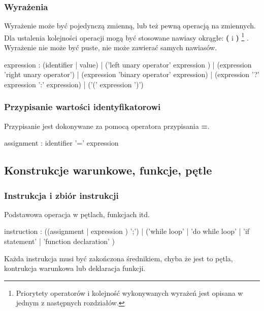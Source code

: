 \documentclass[12pt,a4paper]{article}
\begin{document}
\subsubsection{Wyrażenia}

Wyrażenie może być pojedynczą zmienną, lub też pewną operacją na zmiennych. Dla ustalenia kolejności operacji mogą być stosowane nawiasy okrągłe: \textbf{(} i \textbf{)}
\footnote{Priorytety operatorów i kolejność wykonywanych wyrażeń jest opisana w jednym z następnych rozdziałów.}
. Wyrażenie nie może być puste, nie może zawierać samych nawiasów.

\begin{rail}

expression : (identifier | value) | ('left unary operator' expression ) | (expression 'right unary operator') | (expression 'binary operator' expression) | (expression '?' expression ':' expression) | ('(' expression ')')

\end{rail}

\subsubsection{Przypisanie wartości identyfikatorowi}

Przypisanie jest dokonywane za pomocą operatora przypisania \textbf{=}. 

\begin{rail}
  assignment : identifier '=' expression
\end{rail}

\subsection{Konstrukcje warunkowe, funkcje, pętle}

\subsubsection{Instrukcja i zbiór instrukcji}

Podstawowa operacja w pętlach, funkcjach itd.

\begin{rail}
  instruction : ((assignment | expression ) ';') | ('while loop' | 'do while loop' | 'if   statement' | 'function declaration' )
\end{rail}

Każda instrukcja musi być zakończona średnikiem, chyba że jest to pętla, kontrukcja warunkowa lub deklaracja funkcji.
\end{document}
